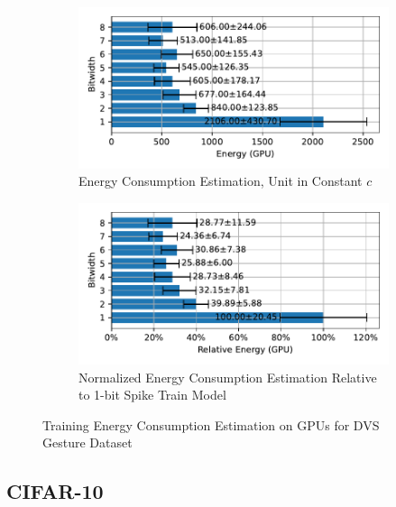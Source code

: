         \begin{figure}[H]
            \centering
            \begin{subfigure}[H]{0.6\textwidth}
                \includegraphics[width=\textwidth]{../standard/DVSGesture/plots/dvsgesture_train_energy_gpu_horizontal.pdf}
                \caption{Energy Consumption Estimation, Unit in Constant $c$}
            \end{subfigure}
            \hfill
            \begin{subfigure}[H]{0.6\textwidth}
                \includegraphics[width=\textwidth]{../standard/DVSGesture/plots/dvsgesture_train_relative_energy_gpu_horizontal.pdf}
                \caption{Normalized Energy Consumption Estimation Relative to 1-bit Spike Train Model}
            \end{subfigure}
            \caption{Training Energy Consumption Estimation on GPUs for DVS Gesture Dataset}
        \end{figure}

    \subsection{CIFAR-10}
    \label{appendix:energy_gpu_cifar10}

